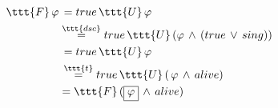 \documentclass[11pt]{article}
\begin{document}
$\begin{aligned}
     \ttt{F}\,\varphi &\,= true\,\ttt{U}\,\varphi \\
     &\overset{\ttt{dsc}}{=} true\,\ttt{U}\,(\varphi\,\land\,(true\,\lor\, sing)) \\
     &\,= true\,\ttt{U}\,\varphi \\
     &\,\overset{\ttt{t}}{=} true\,\ttt{U}\,(\,\varphi\,\land\,alive) \\
     & = \ttt{F}\,(\boxed{\varphi}\,\land\,alive)
\end{aligned}$
\end{document}
